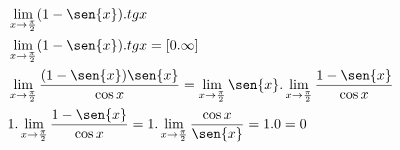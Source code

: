 \begin{ex}
\begin{align}
&\lim_{x\rightarrow \frac{\pi}{2}} (1-\sen{x}).tg{x}\nonumber\\
&\lim_{x\rightarrow \frac{\pi}{2}} (1-\sen{x}).tg{x} = [0.\infty]\nonumber\\
&\lim_{x\rightarrow \frac{\pi}{2}} \frac{(1-\sen{x})\sen{x}}{\cos{x}}=\lim_{x\rightarrow \frac{\pi}{2}} \sen{x}.\lim_{x\rightarrow \frac{\pi}{2}} \frac{1-\sen{x}}{\cos{x}}\nonumber\\
&1.\lim_{x\rightarrow \frac{\pi}{2}} \frac{1-\sen{x}}{\cos{x}}=1.\lim_{x\rightarrow \frac{\pi}{2}} \frac{\cos{x}}{\sen{x}}=1.0=0\nonumber
\end{align}
\end{ex}
